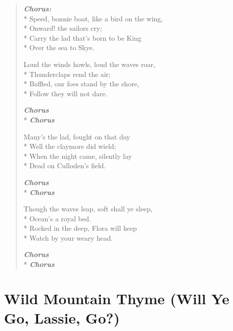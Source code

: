 \documentclass[9pt,twoside]{extarticle}
\makeatletter
\newenvironment{xverse}{
	\begin{verse}
	\fontsize{8.5}{10.5}\selectfont
}{
	\end{verse}
}
\newcommand{\chorusdef}{\textbf{\emph{Chorus:}}\\*}
\newcommand{\chorus@mark}[1][1]{%
\textbf{\emph{Chorus \ifthenelse{\equal{#1}{1}}{}{$\times$ #1}}}%
}
\newcommand{\chorusmark}[1][1]{%
\ifvmode%
\vspace{-0.5\stanzaskip}%
\chorus@mark[#1]%
\vspace{-0.5\stanzaskip}%
\else \\*%
\chorus@mark[#1]%
\fi%
}
\makeatother
\begin{document}
\begin{xverse}
\chorusdef
Speed, bonnie boat, like a bird on the wing, \\*
Onward! the sailors cry; \\*
Carry the lad that’s born to be King \\*
Over the sea to Skye.

Loud the winds howls, loud the waves roar, \\*
Thunderclaps rend the air; \\*
Baffled, our foes stand by the shore, \\*
Follow they will not dare.

\chorusmark

Many’s the lad, fought on that day \\*
Well the claymore did wield; \\*
When the night came, silently lay \\*
Dead on Culloden’s field.

\chorusmark

Though the waves leap, soft shall ye sleep, \\*
Ocean’s a royal bed. \\*
Rocked in the deep, Flora will keep \\*
Watch by your weary head.

\chorusmark
\end{xverse}

\section{Wild Mountain Thyme (Will Ye Go, Lassie, Go?)}
\end{document}
